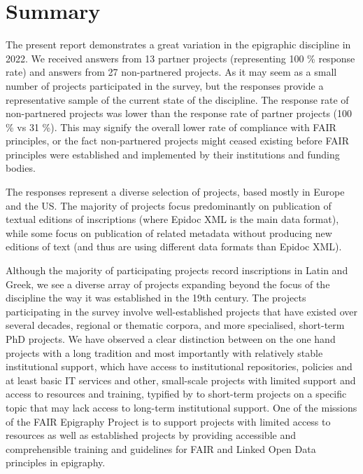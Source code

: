 \documentclass[
  12pt,
]{scrreprt}
\begin{document}
\hypertarget{summary}{%
\chapter{Summary}\label{summary}}

The present report demonstrates a great variation in the epigraphic
discipline in 2022. We received answers from 13 partner projects
(representing 100 \% response rate) and answers from 27 non-partnered
projects. As it may seem as a small number of projects participated in
the survey, but the responses provide a representative sample of the
current state of the discipline. The response rate of non-partnered
projects was lower than the response rate of partner projects (100 \% vs
31 \%). This may signify the overall lower rate of compliance with FAIR
principles, or the fact non-partnered projects might ceased existing
before FAIR principles were established and implemented by their
institutions and funding bodies.

The responses represent a diverse selection of projects, based mostly in
Europe and the US. The majority of projects focus predominantly on
publication of textual editions of inscriptions (where Epidoc XML is the
main data format), while some focus on publication of related metadata
without producing new editions of text (and thus are using different
data formats than Epidoc XML).

Although the majority of participating projects record inscriptions in
Latin and Greek, we see a diverse array of projects expanding beyond the
focus of the discipline the way it was established in the 19th century.
The projects participating in the survey involve well-established
projects that have existed over several decades, regional or thematic
corpora, and more specialised, short-term PhD projects. We have observed
a clear distinction between on the one hand projects with a long
tradition and most importantly with relatively stable institutional
support, which have access to institutional repositories, policies and
at least basic IT services and other, small-scale projects with limited
support and access to resources and training, typified by to short-term
projects on a specific topic that may lack access to long-term
institutional support. One of the missions of the FAIR Epigraphy Project
is to support projects with limited access to resources as well as
established projects by providing accessible and comprehensible training
and guidelines for FAIR and Linked Open Data principles in epigraphy.
\end{document}

